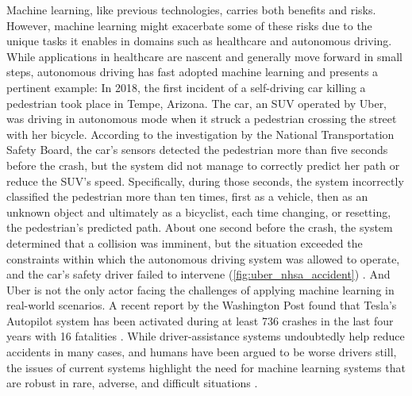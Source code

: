 Machine learning, like previous technologies, carries both benefits and risks. 
However, machine learning might exacerbate some of these risks due to the unique tasks it enables in domains such as healthcare and autonomous driving. 
While applications in healthcare are nascent and generally move forward in small steps, autonomous driving has fast adopted machine learning and presents a pertinent example: 
In 2018, the first incident of a self-driving car killing a pedestrian took place in Tempe, Arizona. 
The car, an SUV operated by Uber, was driving in autonomous mode when it struck a pedestrian crossing the street with her bicycle. 
According to the investigation by the National Transportation Safety Board, the car's sensors detected the pedestrian more than five seconds before the crash, but the system did not manage to correctly predict her path or reduce the SUV's speed. 
Specifically, during those seconds, the system incorrectly classified the pedestrian more than ten times, first as a vehicle, then as an unknown object and ultimately as a bicyclist, each time changing, or resetting, the pedestrian's predicted path. 
About one second before the crash, the system determined that a collision was imminent, but the situation exceeded the constraints within which the autonomous driving system was allowed to operate, and the car's safety driver failed to intervene (\cref{fig:uber_nhsa_accident}) \parencite{nationaltransportationsafetyboardnhsa_collision_2019}. 
%
And Uber is not the only actor facing the challenges of applying machine learning in real-world scenarios. A recent report by the Washington Post found that Tesla's Autopilot system has been activated during at least 736 crashes in the last four years with 16 fatalities \parencite{siddiqui_17_2023}. 
While driver-assistance systems undoubtedly help reduce accidents in many cases, and humans have been argued to be worse drivers still, the issues of current systems highlight the need for machine learning systems that are robust in rare, adverse, and difficult situations \parencite{metz_how_2022}. 

